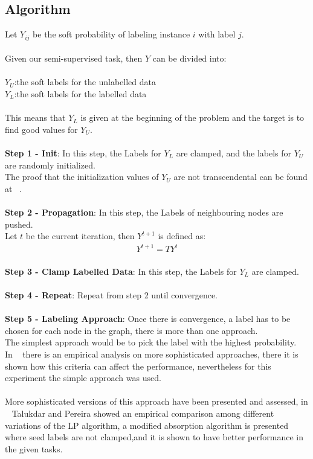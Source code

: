 \documentclass[4pt,a4paper,twocolumn]{article}
\begin{document}
\subsection{Algorithm}
Let $Y_{ij}$ be the soft probability of labeling instance $i$ with label $j$.\\
\\
Given our semi-supervised task, then $Y$ can be divided into:\\
\\
$Y_{U}$:the soft labels for the unlabelled data\\
$Y_{L}$:the soft labels for the labelled data\\
\\
This means that $Y_{L}$ is given at the beginning of the problem
and the target is to find good values for $Y_{U}$.\\
\\
\textbf{Step 1 - Init}: In this step, the Labels for $Y_{L}$ are clamped, and the labels for $Y_{U}$ are randomly initialized.\\
The proof that the initialization values of $Y_{U}$ are not transcendental can be found at ~\cite{Zhu:2005:SLG:1104523}.\\
\\
\textbf{Step 2 - Propagation}: In this step, the Labels of neighbouring nodes are pushed.\\
Let $t$ be the current iteration, then $Y^{t+1}$ is defined as:
\begin{align}
Y^{t+1} = T Y^{t}
\end{align}
\\
\textbf{Step 3 - Clamp Labelled Data}: In this step, the Labels for $Y_{L}$ are clamped.\\
\\
\textbf{Step 4 - Repeat}: Repeat from step 2 until convergence.\\
\\
\textbf{Step 5 - Labeling Approach}: Once there is convergence, a label has to be chosen for each node in the graph, there is more than one approach.\\
The simplest approach would be to pick the label with the highest probability. \\
In ~\cite{Zhu:2005:SLG:1104523} there is an empirical analysis on more sophisticated approaches, there it is shown how this criteria can affect the performance, nevertheless for this experiment the simple approach was used.\\
\\
More sophisticated versions of this approach have been presented and assessed, in ~\cite{Talukdar:2010:EGS:1858681.1858830} Talukdar and Pereira showed an empirical comparison among different variations of the LP algorithm, a modified absorption algorithm is presented where seed labels are not clamped,and it is shown to have better performance in the given tasks.
\end{document}
